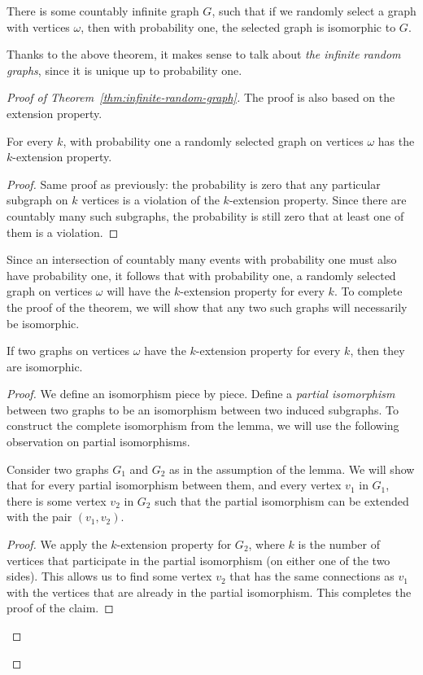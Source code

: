 \begin{theorem}\label{thm:infinite-random-graph}	
	There is some countably infinite graph $G$, such that if we randomly select a graph with vertices $\omega$, then with probability one, the selected graph is isomorphic to $G$.	
\end{theorem}

Thanks to the above theorem, it makes sense to talk about \emph{the infinite random graphs}, since it is unique up to probability one. 

\begin{proof}[Proof of Theorem~\ref{thm:infinite-random-graph}]
	The proof is also based on the extension property. 
	\begin{lemma}\label{lem:infinite-random-graph-extension}
		For every $k$, with probability one a randomly selected graph on vertices $\omega$ has the $k$-extension property.
	\end{lemma}
	\begin{proof}
		Same proof as previously: the probability is zero that any particular subgraph on $k$ vertices is a violation of the $k$-extension property. Since there are countably many such subgraphs, the probability is still zero that at least one  of them is a violation.
	\end{proof}

Since an intersection of countably many events with probability one must also have probability one, it follows that with probability one, a randomly selected graph on vertices $\omega$ will have the $k$-extension property for every $k$. To complete the proof of the theorem, we will show that any two such graphs will necessarily be isomorphic.
\begin{lemma}\label{lem:infinite-random-graph-isomorphism}
	If two graphs on  vertices $\omega$ have the $k$-extension property for every $k$, then they are isomorphic.
\end{lemma}
\begin{proof}
	We define an isomorphism piece by piece. Define a \emph{partial isomorphism} between two graphs to be an isomorphism between two induced subgraphs. To construct the complete isomorphism from the lemma, we will use the following observation on partial isomorphisms.
	\begin{claim}
		Consider two graphs $G_1$ and $G_2$ as in the assumption of the lemma.
		We will show that for every partial isomorphism between them, and every vertex $v_1$ in $G_1$, there is some vertex $v_2$ in $G_2$ such that the partial isomorphism can be extended with the pair $(v_1,v_2)$. 
	\end{claim}\label{claim:partial-isomorphism}
	\begin{proof}
		We apply the $k$-extension property for $G_2$, where $k$ is the number of vertices that participate in the partial isomorphism (on either one of the two sides). This allows us to find some vertex $v_2$ that has the same connections as $v_1$ with the vertices that are already in the partial isomorphism. This completes the proof of the claim.
	\end{proof}


\end{proof}
\end{proof}
